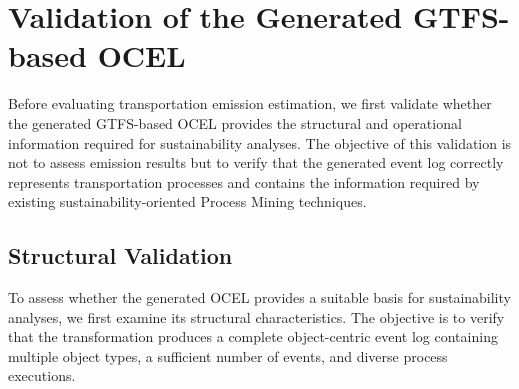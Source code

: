 

\begin{table}[H]
\caption{Metrics on the event logs used in the evaluation.}
\label{tab:event-log-overview}

\renewcommand{\arraystretch}{1.55}
\setlength{\tabcolsep}{5pt}

\end{table}


\section{Validation of the Generated GTFS-based OCEL}
Before evaluating transportation emission estimation, we first validate whether the generated GTFS-based OCEL provides the structural and operational information required for sustainability analyses. The objective of this validation is not to assess emission results but to verify that the generated event log correctly represents transportation processes and contains the information required by existing sustainability-oriented Process Mining techniques.

\subsection{Structural Validation}
To assess whether the generated OCEL provides a suitable basis for sustainability analyses, we first examine its structural characteristics. The objective is to verify that the transformation produces a complete object-centric event log containing multiple object types, a sufficient number of events, and diverse process executions.





